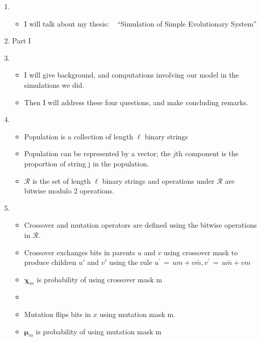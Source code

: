 \documentclass{article}
\begin{document}
\setcounter{page}{1}    
\newlength{\mywidth}
\setlength{\mywidth}{0.9\linewidth}
\newlength{\myheight}
\setlength{\myheight}{0.5in}
    
\begin{enumerate}
\item
  \begin{itemize}
  \item I will talk about my thesis: \hfill\mbox{ }\linebreak
      ``Simulation of Simple Evolutionary System'' 
  \end{itemize}
  
  \item Part I
    
\item
  \begin{itemize}
  \item      
      I will give background, and computations involving our model in the simulations we did. 
  \item
      Then I will address these four questions, and make
      concluding remarks.    
  \end{itemize}

\item
  \begin{itemize}
  \item Population is a collection of length $\ell$ binary strings 
  \item Population can be represented by a vector; the $j$th component
      is the proportion of string j in the population.
    \item $\mathcal{R}$ is the set of length $\ell$ binary strings and operations under $\mathcal{R}$ are bitwise modulo 2 operations.
  \end{itemize}
    
\item
  \begin{itemize}
  \item Crossover and mutation operators are defined using the
    bitwise operations in $\mathcal{R}$.
  \item Crossover exchanges bits in parents $u$ and $v$ using crossover mask to produce children $u'$ and $v'$ 
  using the rule $u^\prime \,=\, um + v\bar{m} , v^\prime \,=\, u\bar{m} + vm$
  \item $\bm{\chi}_m$ is probability of using crossover mask m
  \item
  \item Mutation flips bits in $x$ using mutation mask m.
  \item $\bm{\mu}_m$ is probability of using mutation mask m
  \end{itemize}
    

\end{enumerate}
\end{document}
